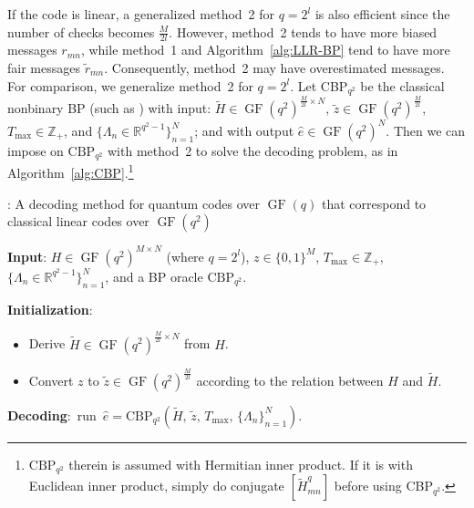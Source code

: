 \documentclass{ieeeaccess}
\DeclareMathOperator{\GF}{GF}
\newcommand{\RR}{{\mathbb R}}
\newcommand{\ZZ}{{\mathbb Z}}
\theoremstyle{definition}		%
\begin{document}
If the code is linear, a generalized method~2 for $q=2^l$ is also efficient since the number of checks becomes $\frac{M}{2l}$.
However, method~2 tends to have more biased messages $r_{mn}$, while method~1 and Algorithm~\ref{alg:LLR-BP} tend to have more fair messages $\tilde r_{mn}$. 
%
Consequently, method~2 may   have overestimated messages. 
%
%
For comparison, we generalize method~2 for ${ q=2^l }$.
Let CBP$_{q^2}$ be the classical nonbinary BP (such as \cite{WSM04})  %
with input: 
${ \tilde H\in\GF(q^2)^{\frac{M}{2l}\times N} }$,
${ \tilde z\in\GF(q^2)^\frac{M}{2l} }$, 
$T_{\max}\in\ZZ_+$, 
and ${ \{\Lambda_n\in\RR^{q^2-1}\}_{n=1}^N }$;
%
and with output $\hat{e}\in\GF(q^2)^N$.
%
%
Then we can impose on $\text{CBP}_{q^2}$ with method~2 to solve the decoding problem, as in Algorithm~\ref{alg:CBP}.\footnote{
	$\text{CBP}_{q^2}$ therein is assumed with Hermitian inner product. If it is with Euclidean inner product, simply do conjugate $[\tilde H_{mn}^q]$ before using CBP$_{q^2}$.
	}



	\begin{algorithm}%
		\begin{flushleft}
			\caption{: A decoding method for quantum codes over $\GF(q)$ that correspond to classical linear codes over $\GF(q^2)$} \label{alg:CBP}
			
			{\bf Input}:
			$H\in\GF(q^2)^{{M}\times N}$ (where $q=2^l$), 
			$z\in\{0,1\}^{M}$, $T_{\max}\in\mathbb{Z}_+$, 
				$\{\Lambda_n\in\RR^{q^2-1}\}_{n=1}^N$, 
			and a BP oracle $\text{CBP}_{q^2}$.
			
			{\bf Initialization}: 
			\begin{itemize}
				\item 	Derive $\tilde H\in\GF(q^2)^{\frac{M}{2l}\times N}$ from $H$. 
				\item Convert $z$ to $\tilde z\in\GF(q^2)^{\frac{M}{2l}}$ according to the relation between $H$ and $\tilde H$.
			\end{itemize}
		
			\mbox{{\bf Decoding}: run $\hat e = \text{CBP}_{q^2}(\tilde H,\, \tilde z,\, T_{\max},\, \{\Lambda_n\}_{n=1}^N)$.}

		\end{flushleft}
	\end{algorithm}
\end{document}
